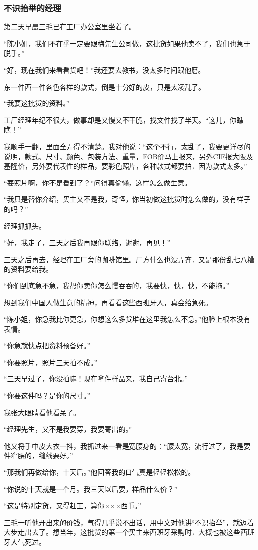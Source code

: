 \subsubsection*{不识抬举的经理}
\par 第二天早晨三毛已在工厂办公室里坐着了。
\par “陈小姐，我们不在乎一定要跟梅先生公司做，这批货如果他卖不了，我们也急于脱手。”
\par “好，现在我们来看看货吧！”我还要去教书，没太多时间跟他磨。
\par 东一件西一件各色各样的款式，倒是十分好的皮，只是太凌乱了。
\par “我要这批货的资料。”
\par 工厂经理年纪不很大，做事却是又慢又不干脆，找文件找了半天。“这儿，你瞧瞧！”
\par 我顺手一翻，里面全弄得不清楚。我对他说：“这个不行，太乱了，我要更详尽的说明，款式、尺寸、颜色、包装方法、重量，FOB价马上报来，另外CIF报大阪及基隆价，另外要代表性的样品，要彩色照片，各种款式都要拍，因为款式太多。”
\par “要照片啊，你不是看到了？”问得真偷懒，这样怎么做生意。
\par “我只是替你介绍，买主又不是我，奇怪，你当初做这批货时怎么做的，没有样子的吗？”
\par 经理抓抓头。
\par “好，我走了，三天之后我再跟你联络，谢谢，再见！”
\par 三天之后再去，经理在工厂旁的咖啡馆里。厂方什么也没弄齐，又是那份乱七八糟的资料要给我。
\par “你们到底急不急，我帮你卖你怎么慢吞吞的，我要快，快，快，不能拖。”
\par 想到我们中国人做生意的精神，再看看这些西班牙人，真会给急死。
\par “陈小姐，你急我比你更急，你想这么多货堆在这里我怎么不急。”他脸上根本没有表情。
\par “你急就快点把资料预备好。”
\par “你要照片，照片三天拍不成。”
\par “三天早过了，你没拍嘛！现在拿件样品来，我自己寄台北。”
\par “你要这件吗？是你的尺寸。”
\par 我张大眼睛看他看呆了。
\par “经理先生，又不是我要穿，我要寄出的。”
\par 他又将手中皮大衣一抖，我抓过来一看是宽腰身的：“腰太宽，流行过了，我是要件窄腰的，缝线要好。”
\par “那我们再做给你，十天后。”他回答我的口气真是轻轻松松的。
\par “你说的十天就是一个月。我三天以后要，样品什么价？”
\par “这是特别定货，又得赶工，算你×××西币。”
\par 三毛一听他开出来的价钱，气得几乎说不出话，用中文对他讲“不识抬举”，就迈着大步走出去了。想当年，这批货的第一个买主来西班牙采购时，大概也被这些西班牙人气死过。

